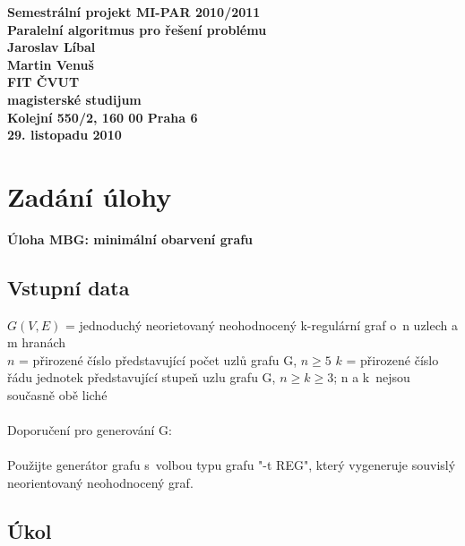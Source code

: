 \documentclass[12pt]{article}
\author{Martin Venuš, Jaroslav Líbal}
\begin{document}

\begin{center}
\bf Semestrální projekt MI-PAR 2010/2011\\[5mm]
    Paralelní algoritmus pro řešení problému\\[5mm]
       Jaroslav Líbal\\
       Martin Venuš\\[5mm]
FIT ČVUT\\[2mm]
magisterské studijum\\[2mm]
Kolejní 550/2, 160 00 Praha 6\\[2mm]
29. listopadu 2010
\end{center}

\newpage
\tableofcontents
\newpage

\section{Zadání úlohy}
\textbf{Úloha MBG: minimální obarvení grafu}

\subsection{Vstupní data}

$G(V,E)$ = jednoduchý neorietovaný neohodnocený k-regulární graf o~n uzlech a m hranách\\
$n$ = přirozené číslo představující počet uzlů grafu G, $n \geq 5$
$k$ = přirozené číslo řádu jednotek představující stupeň uzlu grafu G, $n \geq k \geq 3$; n a k~nejsou současně obě liché\\
\\
Doporučení pro generování G:\\
\\
Použijte generátor grafu s~volbou typu grafu "-t REG", který vygeneruje souvislý neorientovaný neohodnocený graf.


\subsection{Úkol} 
\end{document}
